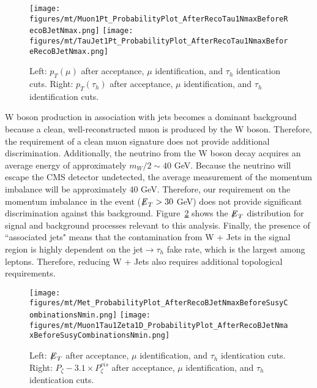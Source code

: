 \begin{figure}\centering
  \texttt{[image: figures/mt/Muon1Pt\_ProbabilityPlot\_AfterRecoTau1NmaxBeforeRecoBJetNmax.png]}
  \texttt{[image: figures/mt/TauJet1Pt\_ProbabilityPlot\_AfterRecoTau1NmaxBeforeRecoBJetNmax.png]}
  \caption{\label{fig:muTauKinematics} Left: $p_{T}(\mu)$ after acceptance, $\mu$ identification, and $\tau_{h}$ identication cuts.  Right: 
$p_{T}(\tau_{h})$ after acceptance, $\mu$ identification, and $\tau_{h}$ identification cuts.}
\end{figure}

W boson production in association with jets becomes a dominant background because a clean, well-reconstructed muon is produced by the W boson. 
Therefore, the requirement of a clean muon signature does not provide additional discrimination. Additionally, the neutrino from the W boson decay acquires 
an average energy of approximately $m_{W}/2 \sim 40$ GeV. Because the neutrino will escape the CMS detector undetected, the average measurement of the momentum 
imbalance will be approximately 40 GeV. Therefore, our requirement on the momentum imbalance in the event (${\not\mathrel{E}}_T > 30$ GeV) does not provide significant 
discrimination against this background. 
Figure~\ref{fig:muTauTopologicalVariables} shows
the ${\not\mathrel{E}}_T$ distribution for signal and background processes relevant to this analysis. 
Finally, the presence of ``associated jets" means that the contamination from W + Jets in the signal region is 
highly dependent on the jet$\to\tau_{h}$ fake rate, which is the largest among leptons. Therefore, reducing W + Jets also requires additional 
topological requirements. 

\begin{figure}\centering
  \texttt{[image: figures/mt/Met\_ProbabilityPlot\_AfterRecoBJetNmaxBeforeSusyCombinationsNmin.png]}
  \texttt{[image: figures/mt/Muon1Tau1Zeta1D\_ProbabilityPlot\_AfterRecoBJetNmaxBeforeSusyCombinationsNmin.png]}
  \caption{\label{fig:muTauTopologicalVariables} Left: ${\not\mathrel{E}}_T$ after acceptance, $\mu$ identification, and 
$\tau_{h}$ identication cuts.  Right: $P_{\zeta}- 3.1 \times P_{\zeta}^{vis}$ after acceptance, $\mu$ identification, and $\tau_{h}$ identication cuts.}
\end{figure}

